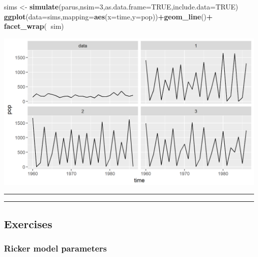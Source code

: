 \documentclass[]{article}
\newenvironment{Shaded}{\begin{snugshade}}{\end{snugshade}}
\newcommand{\KeywordTok}[1]{\textcolor[rgb]{0.13,0.29,0.53}{\textbf{#1}}}
\newcommand{\DataTypeTok}[1]{\textcolor[rgb]{0.13,0.29,0.53}{#1}}
\newcommand{\DecValTok}[1]{\textcolor[rgb]{0.00,0.00,0.81}{#1}}
\newcommand{\StringTok}[1]{\textcolor[rgb]{0.31,0.60,0.02}{#1}}
\newcommand{\OtherTok}[1]{\textcolor[rgb]{0.56,0.35,0.01}{#1}}
\newcommand{\OperatorTok}[1]{\textcolor[rgb]{0.81,0.36,0.00}{\textbf{#1}}}
\newcommand{\NormalTok}[1]{#1}
\begin{document}
\begin{Shaded}
\begin{Highlighting}[]
\NormalTok{sims <-}\StringTok{ }\KeywordTok{simulate}\NormalTok{(parus,}\DataTypeTok{nsim=}\DecValTok{3}\NormalTok{,}\DataTypeTok{as.data.frame=}\OtherTok{TRUE}\NormalTok{,}\DataTypeTok{include.data=}\OtherTok{TRUE}\NormalTok{)}
\KeywordTok{ggplot}\NormalTok{(}\DataTypeTok{data=}\NormalTok{sims,}\DataTypeTok{mapping=}\KeywordTok{aes}\NormalTok{(}\DataTypeTok{x=}\NormalTok{time,}\DataTypeTok{y=}\NormalTok{pop))}\OperatorTok{+}\KeywordTok{geom_line}\NormalTok{()}\OperatorTok{+}
\StringTok{  }\KeywordTok{facet_wrap}\NormalTok{(}\OperatorTok{~}\NormalTok{sim)}
\end{Highlighting}
\end{Shaded}

\begin{center}\includegraphics{figure/intro-ricker-second-sim-1} \end{center}

\begin{center}\rule{0.5\linewidth}{\linethickness}\end{center}

\begin{center}\rule{0.5\linewidth}{\linethickness}\end{center}

\subsection{Exercises}\label{exercises}

\subsubsection{Ricker model parameters}\label{ricker-model-parameters}
\end{document}
